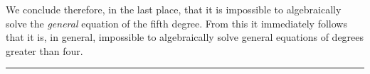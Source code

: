 \documentclass[oneside, 12 pt, leqno]{memoir}
\begin{document}
We conclude therefore, in the last place, that it is impossible to algebraically solve the \textit{general} equation of the fifth degree. From this it immediately follows that it is, in general, impossible to algebraically solve general equations of degrees greater than four.
\begin{center}\rule{2in}{0.1pt}\end{center}
\end{document}
